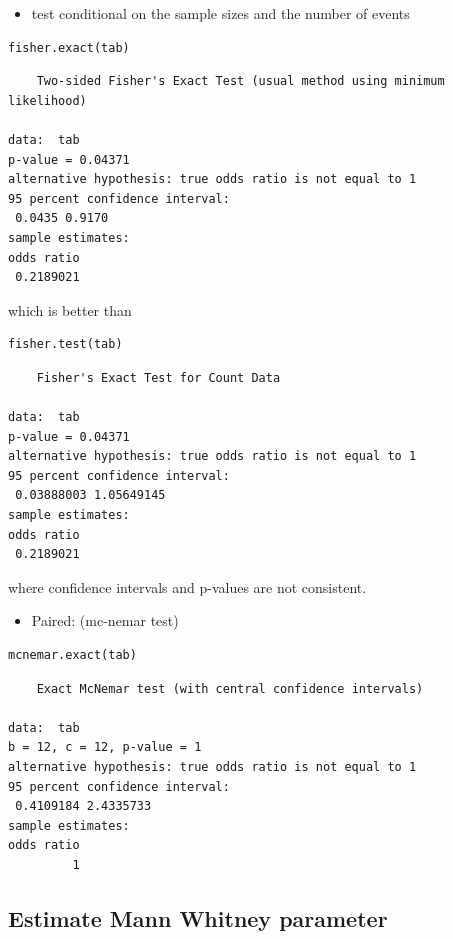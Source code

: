 \documentclass{article}
\begin{document}
\bigskip

\begin{itemize}
\item test conditional on the sample sizes and the number of events
\end{itemize}
\lstset{language=r,label= ,caption= ,captionpos=b,numbers=none}
\begin{lstlisting}
fisher.exact(tab)
\end{lstlisting}

\begin{verbatim}
	Two-sided Fisher's Exact Test (usual method using minimum likelihood)

data:  tab
p-value = 0.04371
alternative hypothesis: true odds ratio is not equal to 1
95 percent confidence interval:
 0.0435 0.9170
sample estimates:
odds ratio 
 0.2189021
\end{verbatim}

which is better than
\lstset{language=r,label= ,caption= ,captionpos=b,numbers=none}
\begin{lstlisting}
fisher.test(tab)
\end{lstlisting}

\begin{verbatim}
	Fisher's Exact Test for Count Data

data:  tab
p-value = 0.04371
alternative hypothesis: true odds ratio is not equal to 1
95 percent confidence interval:
 0.03888003 1.05649145
sample estimates:
odds ratio 
 0.2189021
\end{verbatim}
where confidence intervals and p-values are not consistent.

\bigskip

\begin{itemize}
\item Paired: (mc-nemar test)
\end{itemize}
\lstset{language=r,label= ,caption= ,captionpos=b,numbers=none}
\begin{lstlisting}
mcnemar.exact(tab)
\end{lstlisting}

\begin{verbatim}
	Exact McNemar test (with central confidence intervals)

data:  tab
b = 12, c = 12, p-value = 1
alternative hypothesis: true odds ratio is not equal to 1
95 percent confidence interval:
 0.4109184 2.4335733
sample estimates:
odds ratio 
         1
\end{verbatim}

\subsection{Estimate Mann Whitney parameter}
\label{sec:orgaeb8eb1}
\end{document}
